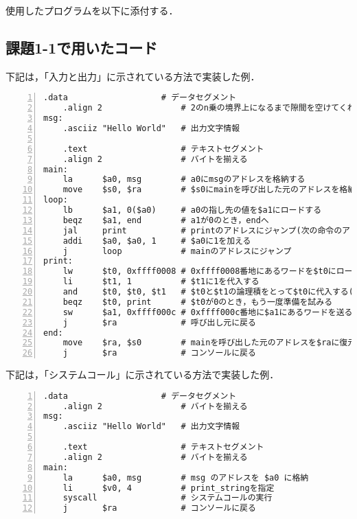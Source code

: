 使用したプログラムを以下に添付する．



\subsection{課題1-1で用いたコード} \label{sec:p1-1}
下記は，「入力と出力」に示されている方法で実装した例．
\begin{Verbatim}[numbers=left, xleftmargin=10mm, numbersep=6pt,
                    fontsize=\small, baselinestretch=0.8]
    .data                   # データセグメント
    .align 2                # 2のn乗の境界上になるまで隙間を空けてくれる
msg:
    .asciiz "Hello World"   # 出力文字情報

    .text                   # テキストセグメント
    .align 2                # バイトを揃える
main:
    la      $a0, msg        # a0にmsgのアドレスを格納する
    move    $s0, $ra        # $s0にmainを呼び出した元のアドレスを格納
loop:
    lb      $a1, 0($a0)     # a0の指し先の値を$a1にロードする
    beqz    $a1, end        # a1が0のとき，endへ
    jal     print           # printのアドレスにジャンプ(次の命令のアドレスを$raに)
    addi    $a0, $a0, 1     # $a0に1を加える
    j       loop            # mainのアドレスにジャンプ
print:
    lw      $t0, 0xffff0008 # 0xffff0008番地にあるワードを$t0にロードする
    li      $t1, 1          # $t1に1を代入する
    and     $t0, $t0, $t1   # $t0と$t1の論理積をとって$t0に代入する($t0が1か確認する)
    beqz    $t0, print      # $t0が0のとき，もう一度準備を試みる
    sw      $a1, 0xffff000c # 0xffff000c番地に$a1にあるワードを送る
    j       $ra             # 呼び出し元に戻る
end:
    move    $ra, $s0        # mainを呼び出した元のアドレスを$raに復元
    j       $ra             # コンソールに戻る
\end{Verbatim}

下記は，「システムコール」に示されている方法で実装した例．
\begin{Verbatim}[numbers=left, xleftmargin=10mm, numbersep=6pt,
                    fontsize=\small, baselinestretch=0.8]
    .data                   # データセグメント
    .align 2                # バイトを揃える
msg:
    .asciiz "Hello World"   # 出力文字情報

    .text                   # テキストセグメント
    .align 2                # バイトを揃える
main:
    la      $a0, msg        # msg のアドレスを $a0 に格納
    li      $v0, 4          # print_stringを指定
    syscall                 # システムコールの実行
    j       $ra             # コンソールに戻る
\end{Verbatim}

